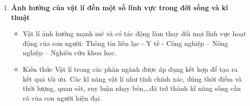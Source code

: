 \begin{enumerate}[label=\bfseries\arabic*.]
\begin{itemize}
	\end{itemize}
\item \textbf{Ảnh hưởng của vật lí đến một số lĩnh vực trong đời sống và kĩ thuật}\\
\begin{itemize}
	\item Vật lí ảnh hưởng mạnh mẽ và có tác động làm thay đổi mọi lĩnh vực hoạt động của con người: Thông tin liên lạc - Y tế - Công nghiệp – Nông nghiệp – Nghiên cứu khoa học.
	\item Kiến thức Vật lí trong các phân ngành được áp dụng kết hợp để tạo ra kết quả tối ưu. Các kĩ năng vật lí như tính chính xác, đúng thời điểm và thời lượng, quan sát, suy luận nhạy bén,\dots đã trở thành kĩ năng sống cần có của con người hiện đại.
\end{itemize}
\end{enumerate}

